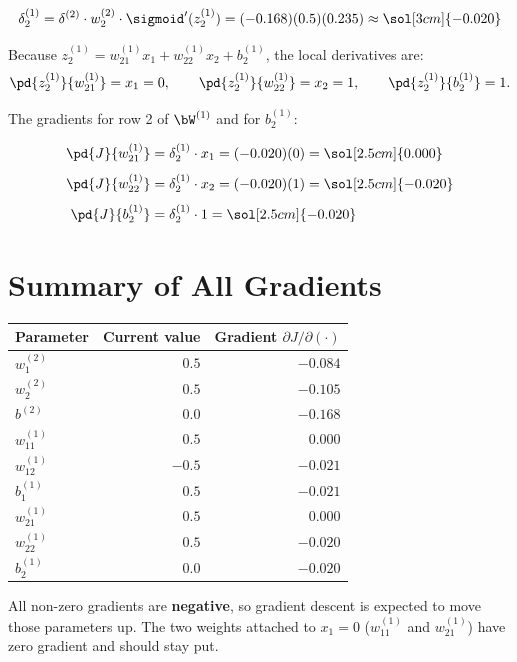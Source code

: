 \documentclass[12pt, a4paper]{article}
\begin{document}
\[
  \delta^{(1)}_2
  = \delta^{(2)} \cdot w^{(2)}_2 \cdot \sigmoid'(z^{(1)}_2)
  = (-0.168)(0.5)(0.235)
  \approx \sol[3cm]{-0.020}
\]

Because $z^{(1)}_2 = w^{(1)}_{21} x_1 + w^{(1)}_{22} x_2 + b^{(1)}_2$,
the local derivatives are:
\[
  \pd{z^{(1)}_2}{w^{(1)}_{21}} = x_1 = 0, \qquad
  \pd{z^{(1)}_2}{w^{(1)}_{22}} = x_2 = 1, \qquad
  \pd{z^{(1)}_2}{b^{(1)}_2} = 1.
\]

The gradients for row 2 of $\bW^{(1)}$ and for $b^{(1)}_2$:

\begin{align*}
  \pd{J}{w^{(1)}_{21}} & = \delta^{(1)}_2 \cdot x_1 = (-0.020)(0) = \sol[2.5cm]{0.000}  \\[4pt]
  \pd{J}{w^{(1)}_{22}} & = \delta^{(1)}_2 \cdot x_2 = (-0.020)(1) = \sol[2.5cm]{-0.020} \\[4pt]
  \pd{J}{b^{(1)}_2}    & = \delta^{(1)}_2 \cdot 1 = \sol[2.5cm]{-0.020}
\end{align*}

\section{Summary of All Gradients}

\begin{center}
  \renewcommand{\arraystretch}{1.5}
  \begin{tabular}{lrr}
    \toprule
    Parameter      & Current value    & Gradient $\partial J / \partial(\cdot)$ \\
    \midrule
    $w^{(2)}_1$    & $\phantom{-}0.5$ & $-0.084$                                \\
    $w^{(2)}_2$    & $\phantom{-}0.5$ & $-0.105$                                \\
    $b^{(2)}$      & $\phantom{-}0.0$ & $-0.168$                                \\
    \midrule
    $w^{(1)}_{11}$ & $\phantom{-}0.5$ & $\phantom{-}0.000$                      \\
    $w^{(1)}_{12}$ & $-0.5$           & $-0.021$                                \\
    $b^{(1)}_1$    & $\phantom{-}0.5$ & $-0.021$                                \\
    \midrule
    $w^{(1)}_{21}$ & $\phantom{-}0.5$ & $\phantom{-}0.000$                      \\
    $w^{(1)}_{22}$ & $\phantom{-}0.5$ & $-0.020$                                \\
    $b^{(1)}_2$    & $\phantom{-}0.0$ & $-0.020$                                \\
    \bottomrule
  \end{tabular}
\end{center}
All non-zero gradients are \textbf{negative}, so gradient descent is expected to move those
parameters up.
The two weights attached to $x_1 = 0$ ($w^{(1)}_{11}$ and $w^{(1)}_{21}$)
have zero gradient and should stay put.
\end{document}
